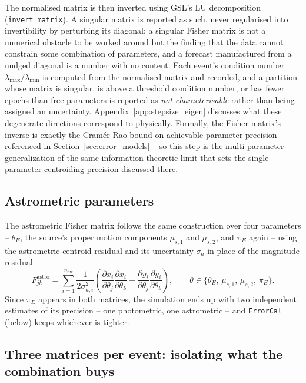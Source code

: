 \documentclass[english,10pt,a4paper]{article}
\begin{document}
	The normalised matrix is then inverted using GSL's LU decomposition \cite{GalassiGSL2009} (\texttt{invert\_matrix}). A singular matrix is reported as such, never regularised into invertibility by perturbing its diagonal: a singular Fisher matrix is not a numerical obstacle to be worked around but the finding that the data cannot constrain some combination of parameters, and a forecast manufactured from a nudged diagonal is a number with no content. Each event's condition number $\lambda_{\max}/\lambda_{\min}$ is computed from the normalised matrix and recorded, and a partition whose matrix is singular, is above a threshold condition number, or has fewer epochs than free parameters is reported as \emph{not characterisable} rather than being assigned an uncertainty. Appendix~\ref{app:stepsize_eigen} discusses what these degenerate directions correspond to physically. Formally, the Fisher matrix's inverse is exactly the Cram\'er-Rao bound on achievable parameter precision \cite{VakiliHogg2016} referenced in Section~\ref{sec:error_models} -- so this step is the multi-parameter generalization of the same information-theoretic limit that sets the single-parameter centroiding precision discussed there.
	
	\subsection{Astrometric parameters}
	
	The astrometric Fisher matrix follows the same construction over four parameters -- $\theta_E$, the source's proper motion components $\mu_{s,1}$ and $\mu_{s,2}$, and $\pi_E$ again -- using the astrometric centroid residual and its uncertainty $\sigma_a$ in place of the magnitude residual:
	\[
	F^{\mathrm{astro}}_{jk} = \sum_{i=1}^{n_{\mathrm{dw}}} \frac{1}{2\sigma_{a,i}^2}\left(\frac{\partial x_i}{\partial\theta_j}\frac{\partial x_i}{\partial\theta_k} + \frac{\partial y_i}{\partial\theta_j}\frac{\partial y_i}{\partial\theta_k}\right), \qquad \theta \in \{\theta_E,\, \mu_{s,1},\, \mu_{s,2},\, \pi_E\}.
	\]
	Since $\pi_E$ appears in both matrices, the simulation ends up with two independent estimates of its precision -- one photometric, one astrometric -- and \texttt{ErrorCal} (below) keeps whichever is tighter.
	
	\subsection{Three matrices per event: isolating what the combination buys}
	\label{subsec:partition}
	
\end{document}
